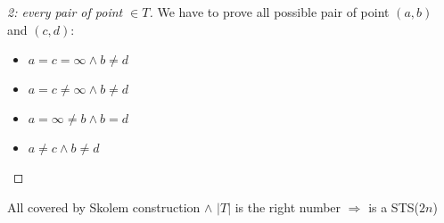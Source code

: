 \begin{frame}
\begin{proof}[2: every pair of point $\in T$]
	We have to prove all possible pair of point $(a,b)$ and $(c,d)$:
	\begin{itemize}
		\item $a=c=\infty \wedge b \not = d$
		\item $a=c\not = \infty \wedge b \not = d$
		\item $a= \infty \not = b \wedge b = d$
		\item $a\not =c \wedge b \not = d $
	\end{itemize}
\end{proof}
\pause
{}
\begin{block}{}
All covered by Skolem construction $\wedge$ $|T|$ is the right number $\Rightarrow$ is a STS($2n$)
\end{block}

\end{frame}

